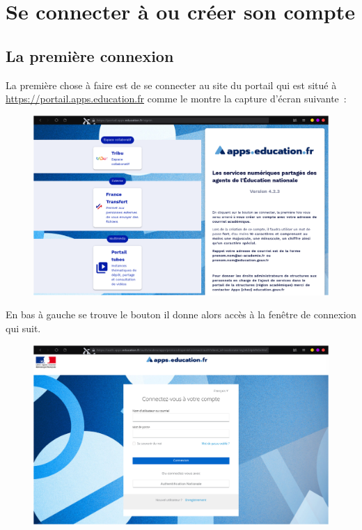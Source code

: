 \chapter{Se connecter à ou créer son compte}

\section{La première connexion}
La première chose à faire est de se connecter au site du portail qui est situé à \url{https://portail.apps.education.fr} comme le montre la capture d'écran suivante~:
\begin{figure}
    \centering
    \includegraphics{Captures/portail.site.web.png}
\end{figure}

En bas à gauche se trouve le bouton  il donne alors accès à la fenêtre de connexion qui suit. 
\begin{figure}
	\centering
	\includegraphics{./Captures/portail.site.web.connexion.png}
\end{figure}

